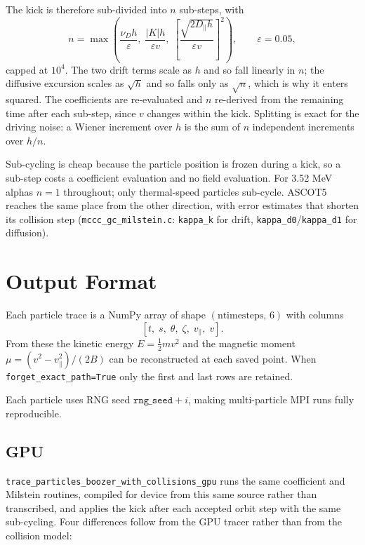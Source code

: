 \documentclass[11pt]{article}
\newcommand{\vpar}{v_{\!\parallel}}
\newcommand{\half}{\tfrac{1}{2}}
\begin{document}
The kick is therefore sub-divided into $n$ sub-steps, with
\begin{equation}
  n = \max\!\left(
      \frac{\nu_D h}{\varepsilon},\;
      \frac{|K| h}{\varepsilon v},\;
      \left[\frac{\sqrt{2 D_\parallel h}}{\varepsilon v}\right]^{2}
    \right),
  \qquad \varepsilon = 0.05,
  \label{eq:nsub}
\end{equation}
capped at $10^4$.  The two drift terms scale as $h$ and so fall linearly in
$n$; the diffusive excursion scales as $\sqrt{h}$ and so falls only as
$\sqrt{n}$, which is why it enters squared.  The coefficients are re-evaluated
and $n$ re-derived from the remaining time after each sub-step, since $v$
changes within the kick.  Splitting is exact for the driving noise: a Wiener
increment over $h$ is the sum of $n$ independent increments over $h/n$.

Sub-cycling is cheap because the particle position is frozen during a kick, so
a sub-step costs a coefficient evaluation and no field evaluation.  For 3.52
MeV alphas $n=1$ throughout; only thermal-speed particles sub-cycle.  ASCOT5
reaches the same place from the other direction, with error estimates that
shorten its collision step (\texttt{mccc\_gc\_milstein.c}: \texttt{kappa\_k}
for drift, \texttt{kappa\_d0}/\texttt{kappa\_d1} for diffusion).

\section{Output Format}

Each particle trace is a NumPy array of shape $(\text{ntimesteps},\,6)$ with columns
\[
  [t,\; s,\; \theta,\; \zeta,\; \vpar,\; v].
\]
From these the kinetic energy $E = \half m v^2$ and the magnetic moment
$\mu = (v^2 - \vpar^2)/(2B)$ can be reconstructed at each saved point.
When \texttt{forget\_exact\_path=True} only the first and last rows are retained.

Each particle uses RNG seed $\texttt{rng\_seed} + i$, making multi-particle
MPI runs fully reproducible.

\subsection{GPU}

\texttt{trace\_particles\_boozer\_with\_collisions\_gpu} runs the same
coefficient and Milstein routines, compiled for device from this same source
rather than transcribed, and applies the kick after each accepted orbit step
with the same sub-cycling.  Four differences follow from the GPU tracer
rather than from the collision model:
\end{document}
